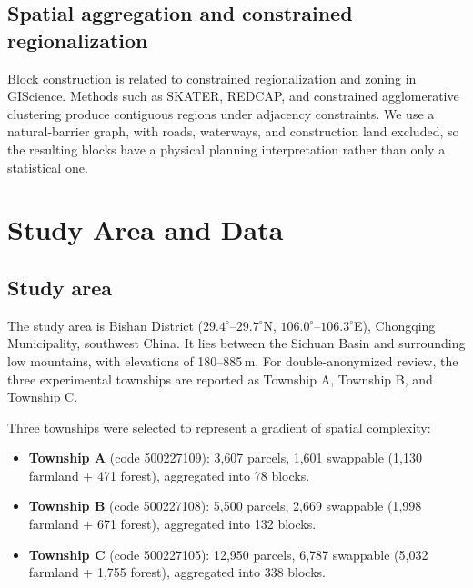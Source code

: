 \documentclass[preprint,12pt]{elsarticle}
\begin{document}
\subsection{Spatial aggregation and constrained regionalization}

Block construction is related to constrained regionalization and zoning in GIScience. Methods such as SKATER, REDCAP, and constrained agglomerative clustering produce contiguous regions under adjacency constraints. We use a natural-barrier graph, with roads, waterways, and construction land excluded, so the resulting blocks have a physical planning interpretation rather than only a statistical one.


\section{Study Area and Data}
\label{sec:data}

\subsection{Study area}

The study area is Bishan District ($29.4^\circ$--$29.7^\circ$N, $106.0^\circ$--$106.3^\circ$E), Chongqing Municipality, southwest China. It lies between the Sichuan Basin and surrounding low mountains, with elevations of 180--885\,m. For double-anonymized review, the three experimental townships are reported as Township A, Township B, and Township C.

Three townships were selected to represent a gradient of spatial complexity:

\begin{itemize}
\item \textbf{Township A} (code 500227109): 3{,}607 parcels, 1{,}601 swappable (1{,}130 farmland + 471 forest), aggregated into 78 blocks.
\item \textbf{Township B} (code 500227108): 5{,}500 parcels, 2{,}669 swappable (1{,}998 farmland + 671 forest), aggregated into 132 blocks.
\item \textbf{Township C} (code 500227105): 12{,}950 parcels, 6{,}787 swappable (5{,}032 farmland + 1{,}755 forest), aggregated into 338 blocks.
\end{itemize}
\end{document}

